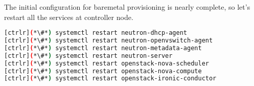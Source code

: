 	The initial configuration for baremetal provisioning is nearly complete, so let's restart all the services at controller node.


\begin{lstlisting}[language=bash,keywords={}]
[ctrlr](*\#*) systemctl restart neutron-dhcp-agent
[ctrlr](*\#*) systemctl restart neutron-openvswitch-agent
[ctrlr](*\#*) systemctl restart neutron-metadata-agent
[ctrlr](*\#*) systemctl restart neutron-server
[ctrlr](*\#*) systemctl restart openstack-nova-scheduler
[ctrlr](*\#*) systemctl restart openstack-nova-compute
[ctrlr](*\#*) systemctl restart openstack-ironic-conductor
\end{lstlisting} 
